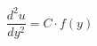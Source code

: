 \documentclass[preview,border=2pt]{standalone}
\begin{document}
\[
\frac{d^2u}{dy^2}= C\cdot f(y)
\]
\end{document}
